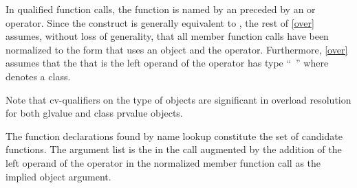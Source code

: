 \pnum
In qualified function calls,
the function is named by an 
preceded by an \tcode{->} or  operator.
Since the
construct
is generally equivalent to
,
the rest of
\ref{over} assumes, without loss of generality, that all member
function calls have been normalized to the form that uses an
object and the
operator.
Furthermore, \ref{over} assumes that
the
that is the left operand of the
operator
has type ``\cv{}~''
where
denotes a class.
\begin{footnote}
Note that cv-qualifiers on the type of objects are
significant in overload
resolution for
both glvalue and class prvalue objects.
\end{footnote}
The function declarations found by name lookup
constitute the set of candidate functions.
The argument list is the
in the call augmented by the addition of the left operand of
the
operator in the normalized member function call as the
implied object argument.

